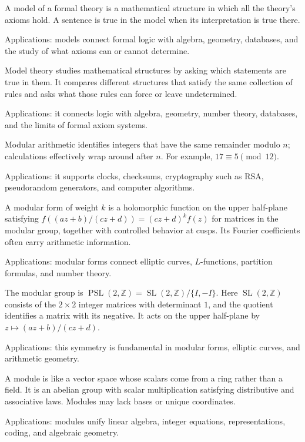 A model of a formal theory is a mathematical structure in which all the theory's axioms hold. A sentence is true in the model when its interpretation is true there. \par\noindent Applications: models connect formal logic with algebra, geometry, databases, and the study of what axioms can or cannot determine.

Model theory studies mathematical structures by asking which statements are true in them. It compares different structures that satisfy the same collection of rules and asks what those rules can force or leave undetermined. \par\noindent Applications: it connects logic with algebra, geometry, number theory, databases, and the limits of formal axiom systems.

Modular arithmetic identifies integers that have the same remainder modulo $n$; calculations effectively wrap around after $n$. For example, $17\equiv5\pmod{12}$. \par\noindent Applications: it supports clocks, checksums, cryptography such as RSA, pseudorandom generators, and computer algorithms.

A modular form of weight $k$ is a holomorphic function on the upper half-plane satisfying $f((az+b)/(cz+d))=(cz+d)^kf(z)$ for matrices in the modular group, together with controlled behavior at cusps. Its Fourier coefficients often carry arithmetic information. \par\noindent Applications: modular forms connect elliptic curves, $L$-functions, partition formulas, and number theory.

The modular group is $\operatorname{PSL}(2,\mathbb{Z})=\operatorname{SL}(2,\mathbb{Z})/\{I,-I\}$. Here $\operatorname{SL}(2,\mathbb{Z})$ consists of the $2\times2$ integer matrices with determinant $1$, and the quotient identifies a matrix with its negative. It acts on the upper half-plane by $z\mapsto(az+b)/(cz+d)$. \par\noindent Applications: this symmetry is fundamental in modular forms, elliptic curves, and arithmetic geometry.

A module is like a vector space whose scalars come from a ring rather than a field. It is an abelian group with scalar multiplication satisfying distributive and associative laws. Modules may lack bases or unique coordinates. \par\noindent Applications: modules unify linear algebra, integer equations, representations, coding, and algebraic geometry.

